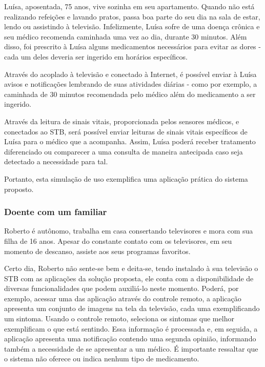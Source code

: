 Luísa, aposentada, 75 anos, vive sozinha em seu apartamento. Quando não está
realizando refeições e lavando pratos, passa boa parte do seu dia na sala de
estar, lendo ou assistindo à televisão. Infelizmente, Luísa sofre de uma doença 
crônica e seu médico recomenda caminhada uma vez ao dia, durante 30 minutos. 
Além disso, foi prescrito à Luísa alguns medicamentos necessários para evitar 
as dores - cada um deles deveria ser ingerido em horários específicos.

Através do \stb[] acoplado à televisão e conectado à Internet, é
possível enviar à Luísa avisos e notificações lembrando de suas atividades
diárias - como por exemplo, a caminhada de 30 minutos recomendada pelo
médico além do medicamento a ser ingerido.

Através da leitura de sinais vitais, proporcionada pelos sensores médicos,
e conectados ao STB, será possível enviar leituras de sinais vitais específicos 
de Luísa para o médico que a acompanha. Assim, Luísa poderá receber tratamento
diferenciado ou comparecer a uma consulta de maneira antecipada caso seja
detectado a necessidade para tal.

Portanto, esta simulação de uso exemplifica uma aplicação prática do sistema 
proposto.


\subsubsection{Doente com um familiar} \label{subsubsec:doente-com-familiar}

Roberto é autônomo, trabalha em casa consertando televisores e mora com sua
filha de 16 anos. Apesar do constante contato com os televisores, em seu momento
de descanso, assiste aos seus programas favoritos.

Certo dia, Roberto não sente-se bem e deita-se, tendo instalado à sua televisão
o STB com as aplicações da solução proposta, ele conta com a disponibilidade de
diversas funcionalidades que podem auxiliá-lo neste momento. Poderá, por
exemplo, acessar uma das aplicação através do controle remoto, a aplicação
apresenta um conjunto de imagens na tela da televisão, cada uma exemplificando
um sintoma.  Usando o controle remoto, seleciona os sintomas que melhor
exemplificam o que está sentindo. Essa informação é processada e, em seguida, a
aplicação apresenta uma notificação contendo uma segunda opinião, informando
também a necessidade de se apresentar a um médico. É importante ressaltar que
o sistema não oferece ou indica nenhum tipo de medicamento.

